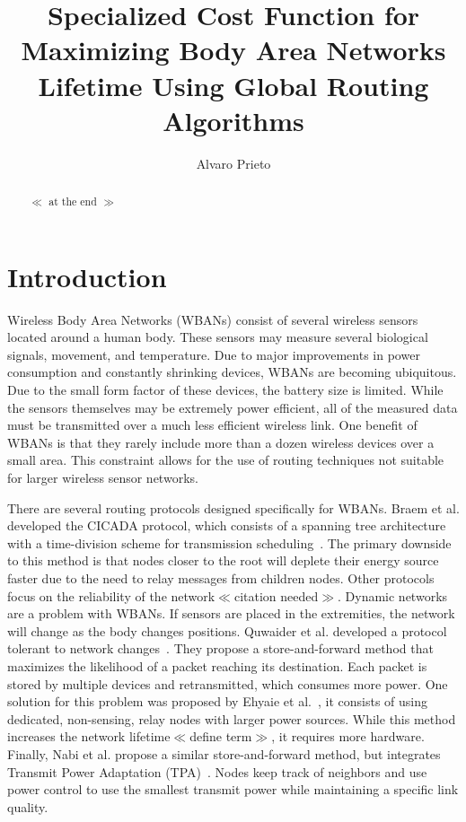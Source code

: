 \documentclass{article}
\begin{document}
\title{Specialized Cost Function for Maximizing Body Area Networks Lifetime Using Global Routing Algorithms}
\author{Alvaro Prieto}
\maketitle

\begin{abstract}
$\ll$ at the end $\gg$
\end{abstract}

\section{Introduction}
Wireless Body Area Networks (WBANs) consist of several wireless sensors located around a human body. These sensors may measure several biological signals, movement, and temperature. Due to major improvements in power consumption and constantly shrinking devices, WBANs are becoming ubiquitous. Due to the small form factor of these devices, the battery size is limited. While the sensors themselves may be extremely power efficient, all of the measured data must be transmitted over a much less efficient wireless link. One benefit of WBANs is that they rarely include more than a dozen wireless devices over a small area. This constraint allows for the use of routing techniques not suitable for larger wireless sensor networks.

There are several routing protocols designed specifically for WBANs. Braem et al. developed the CICADA protocol, which consists of a spanning tree architecture with a time-division scheme for transmission scheduling~\cite{protocol:CICADA}. The primary downside to this method is that nodes closer to the root will deplete their energy source faster due to the need to relay messages from children nodes. Other protocols focus on the reliability of the network$\ll$citation needed$\gg$. Dynamic networks are a problem with WBANs. If sensors are placed in the extremities, the network will change as the body changes positions. Quwaider et al. developed a protocol tolerant to network changes~\cite{routing:storeandforward}. They propose a store-and-forward method that maximizes the likelihood of a packet reaching its destination. Each packet is stored by multiple devices and retransmitted, which consumes more power. One solution for this problem was proposed by Ehyaie et al.~\cite{relay:networklife}, it consists of using dedicated, non-sensing, relay nodes with larger power sources. While this method increases the network lifetime$\ll$define term$\gg$, it requires more hardware. Finally, Nabi et al. propose a similar store-and-forward method, but integrates Transmit Power Adaptation (TPA)~\cite{relay:transmitpoweradaptation}. Nodes keep track of neighbors and use power control to use the smallest transmit power while maintaining a specific link quality.
\end{document}
